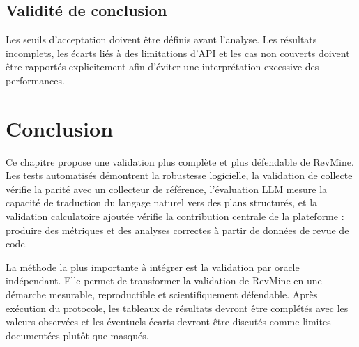 \subsection{Validité de conclusion}

Les seuils d'acceptation doivent être définis avant l'analyse. Les résultats incomplets, les écarts liés à des limitations d'API et les cas non couverts doivent être rapportés explicitement afin d'éviter une interprétation excessive des performances.

\section{Conclusion}
\label{sec:conclusion-validation}

Ce chapitre propose une validation plus complète et plus défendable de RevMine. Les tests automatisés démontrent la robustesse logicielle, la validation de collecte vérifie la parité avec un collecteur de référence, l'évaluation LLM mesure la capacité de traduction du langage naturel vers des plans structurés, et la validation calculatoire ajoutée vérifie la contribution centrale de la plateforme : produire des métriques et des analyses correctes à partir de données de revue de code.

La méthode la plus importante à intégrer est la validation par oracle indépendant. Elle permet de transformer la validation de RevMine en une démarche mesurable, reproductible et scientifiquement défendable. Après exécution du protocole, les tableaux de résultats devront être complétés avec les valeurs observées et les éventuels écarts devront être discutés comme limites documentées plutôt que masqués.
